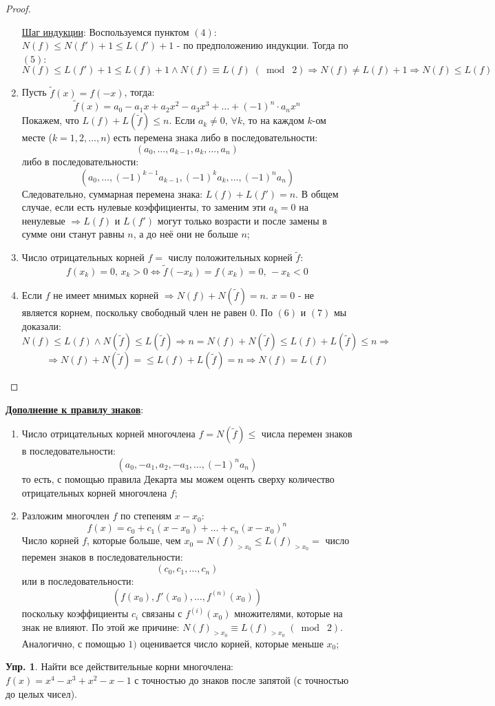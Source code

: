 \documentclass[12pt]{article}
\theoremstyle{definition}
\newtheorem{exrc}{Упр.}
\newcommand{\wte}[1]{\widetilde{#1}}
\newcommand{\modn}[3]{#1 \equiv #2 \; (\bmod \; #3)}
\begin{document}
\begin{proof}
\begin{enumerate}[label=(\arabic*)]
		\uline{Шаг индукции}: Воспользуемся пунктом $(4)$: $N(f) \leq N(f') +1 \leq L(f') + 1$ - по предположению индукции. Тогда по $(5)$:
		$$
			N(f) \leq L(f') + 1 \leq L(f) + 1 \wedge \modn{N(f)}{L(f)}{2} \Rightarrow N(f) \neq L(f) + 1 \Rightarrow N(f) \leq L(f)
		$$
		\item Пусть $\wte{f}(x) = f(-x)$, тогда:
		$$
			\wte{f}(x) = a_0 - a_1x + a_2 x^2 - a_3x^3 + \dotsc + (-1)^n{\cdot}a_nx^n
		$$
		Покажем, что $L(f) + L(\wte{f}) \leq n$. Если $a_k \neq 0, \, \forall k$, то на каждом $k$-ом месте ($k = 1,2,\dotsc,n$) есть перемена знака либо в последовательности:
		$$
			(a_0, \dotsc, a_{k-1},a_k,\dotsc, a_n)
		$$
		либо в последовательности:
		$$
			(a_0, \dotsc, (-1)^{k-1}a_{k-1}, (-1)^ka_k, \dotsc, (-1)^na_n)
		$$
		Следовательно, суммарная перемена знака: $L(f) + L(f') = n$. В общем случае, если есть нулевые коэффициенты, то заменим эти $a_k = 0$ на  ненулевые $\Rightarrow L(f)$ и $L(f')$ могут только возрасти и после замены в сумме они станут равны $n$, а до неё они не больше $n$;
		\item Число отрицательных корней $f =$ числу положительных корней $\wte{f}$:
		$$
			f(x_k) = 0, \, x_k > 0 \Leftrightarrow \wte{f}(-x_k) = f(x_k) = 0, \, -x_k < 0 
		$$ 
		\item Если $f$ не имеет мнимых корней $\Rightarrow N(f) + N(\wte{f}) = n$. $x = 0$ - не является корнем, поскольку свободный член не равен $0$. По $(6)$ и $(7)$ мы доказали:
		$$
			N(f) \leq L(f)\wedge N(\wte{f}) \leq L(\wte{f}) \Rightarrow n = N(f) + N(\wte{f}) \leq L(f) + L(\wte{f}) \leq n \Rightarrow 
		$$
		$$
			\Rightarrow N(f) + N(\wte{f}) = \leq L(f) + L(\wte{f}) = n \Rightarrow N(f) = L(f)
		$$
	\end{enumerate}
\end{proof}

\textbf{\uline{Дополнение к правилу знаков}}:
\begin{enumerate}[label=\arabic*)]
	\item Число отрицательных корней многочлена $f = N(\wte{f}) \leq$ числа перемен знаков в последовательности:
	$$
		(a_0, -a_1, a_2, -a_3, \dotsc, (-1)^na_n)
	$$
	то есть, с помощью правила Декарта мы можем оценть сверху количество отрицательных корней многочлена $f$;
	\item Разложим многочлен $f$ по степеням $x - x_0$:
	$$
		f(x) = c_0 + c_1(x - x_0) + \dotsc + c_n(x - x_0)^n
	$$
	Число корней $f$, которые больше, чем $x_0 = N(f)_{>x_0}\leq L(f)_{> x_0} =$ число перемен знаков в последовательности:
	$$
		(c_0, c_1, \dotsc, c_n)
	$$
	или в последовательности:
	$$
		(f(x_0), f'(x_0), \dotsc, f^{(n)}(x_0))
	$$
	поскольку коэффициенты $c_i$ связаны с $f^{(i)}(x_0)$ множителями, которые на знак не влияют. По этой же причине: $\modn{N(f)_{>x_0}}{L(f)_{> x_0}}{2}$. Аналогично, с помощью $1)$ оценивается число корней, которые меньше $x_0$; 
\end{enumerate}
\begin{exrc}
	Найти все действительные корни многочлена: $f(x) = x^4 - x^3 + x^2 - x - 1$ с точностью до знаков после запятой (с точностью до целых чисел).
\end{exrc}
\end{document}
